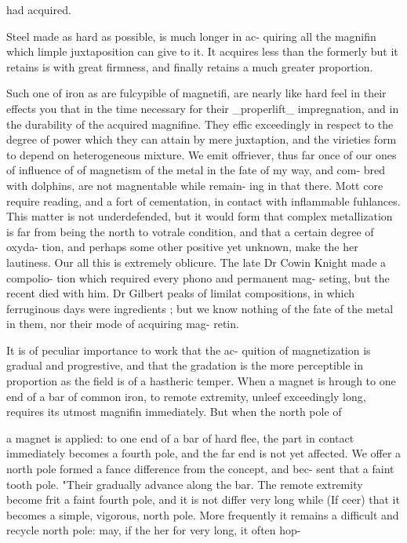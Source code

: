 had acquired.\par\medskip
Steel made as hard as possible, is much longer in ac-
quiring all the magnifin which limple juxtaposition
can give to it. It acquires less than the formerly but it
retains is with great firmness, and finally retains a much
greater proportion.\par\medskip
Such one of iron as are fulcypible of magnetifi,
are nearly like hard feel in their effects you that in
the time necessary for their \_properlift\_ impregnation, and
in the durability of the acquired magnifine. They
effic exceedingly in respect to the degree of power
which they can attain by mere juxtaption, and the
virieties form to depend on heterogeneous mixture.
We emit offriever, thus far once of our ones of influence of
of magnetism of the metal in the fate of my way, and com-
bred with dolphins, are not magnentable while remain-
ing in that there. Mott core require reading, and a fort
of cementation, in contact with inflammable fuhlances.
This matter is not underdefended, but it would form
that complex metallization is far from being the north to
votrale condition, and that a certain degree of oxyda-
tion, and perhaps some other positive yet unknown,
make the her lautiness. Our all this is extremely
oblicure. The late Dr Cowin Knight made a compolio-
tion which required every phono and permanent mag-
seting, but the recent died with him. Dr Gilbert
peaks of limilat compositions, in which ferruginous
days were ingredients ; but we know nothing of the fate
of the metal in them, nor their mode of acquiring mag-
retin.\par\medskip
It is of peculiar importance to work that the ac-
quition of magnetization is gradual and progrestive, and
that the gradation is the more perceptible in proportion
as the field is of a hastheric temper. When a magnet is
hrough to one end of a bar of common iron, to remote
extremity, unleef exceedingly long, requires its utmost
magnifin immediately. But when the north pole of\par\medskip
a magnet is applied: to one end of a bar of hard flee,
the part in contact immediately becomes a fourth pole,
and the far end is not yet affected. We offer a north
pole formed a fance difference from the concept, and bec-
sent that a faint tooth pole. "Their gradually advance
along the bar. The remote extremity become frit a
faint fourth pole, and it is not differ very long while
(If ceer) that it becomes a simple, vigorous, north
pole. More frequently it remains a difficult and recycle
north pole: may, if the her for very long, it often hop-
